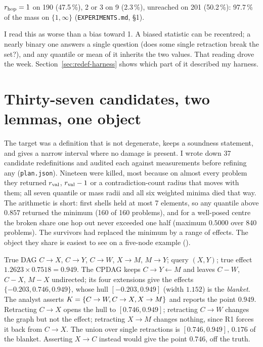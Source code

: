 \begin{medido}
$r_{\mathrm{hop}} = 1$ on 190 (47.5\,\%), 2 or 3 on 9 (2.3\,\%), unreached on 201 (50.2\,\%): 97.7\,\% of the mass on
$\{1,\infty\}$ (\texttt{EXPERIMENTS.md}, \S1).
\end{medido}

I read this as worse than a bias toward 1. A biased statistic can be recentred; a nearly binary one answers a
single question (does some single retraction break the set?), and any quantile or mean of it inherits the two
values. That reading drove the week. Section~\ref{sec:redef-harness} shows which part of it described my harness.

\begin{antes}
\end{antes}

\section{Thirty-seven candidates, two lemmas, one object}
\label{sec:redef-object}

The target was a definition that is not degenerate, keeps a soundness statement, and gives a narrow interval
where no damage is present. I wrote down 37 candidate redefinitions and audited each against measurements
before refining any (\texttt{plan.json}). Nineteen were killed, most because on almost every problem they
returned $r_{\mathrm{val}}$, $r_{\mathrm{val}} - 1$ or a contradiction-count radius that moves with them; all seven quantile or mass
radii and all six weighted minima died that way. The arithmetic is short: first shells held at most 7 elements,
so any quantile above $0.857$ returned the minimum (160 of 160 problems), and for a well-posed centre the broken
share one hop out never exceeded one half (maximum $0.5000$ over 840 problems). The survivors had replaced the
minimum by a range of effects. The object they share is easiest to see on a five-node example
().

\begin{exemplo}
True DAG $C\to X$, $C\to Y$, $C\to W$, $X\to M$, $M\to Y$; query $(X,Y)$; true effect $1.2623 \times 0.7518 =
0.949$. The CPDAG keeps $C\to Y\leftarrow M$ and leaves $C-W$, $C-X$, $M-X$ undirected; its four extensions give
the effects $\{-0.203, 0.746, 0.949\}$, whose hull $[-0.203, 0.949]$ (width $1.152$) is the \emph{blanket}. The
analyst asserts $K = \{C\to W, C\to X, X\to M\}$ and reports the point $0.949$. Retracting $C\to X$ opens the
hull to $[0.746, 0.949]$; retracting $C\to W$ changes the graph but not the effect; retracting $X\to M$ changes
nothing, since R1 forces it back from $C\to X$. The union over single retractions is $[0.746, 0.949]$, $0.176$ of
the blanket. Asserting $X\to C$ instead would give the point $0.746$, off the truth.
\end{exemplo}

